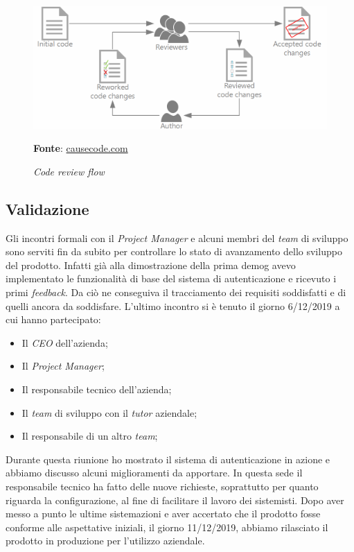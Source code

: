     \begin{figure}[ht]
        \centering
        \includegraphics[width=1\textwidth]{immagini/code_review.png}
        \caption{\textit{Code review flow}}
        \textbf{Fonte}:
        \href{https://storage.googleapis.com/causecode-wordpress-media/2019/01/97795825-code-review-process-1024x429.png}{causecode.com}
        \label{fig: Code review flow}
    \end{figure}

\subsection{Validazione}
Gli incontri formali con il \textit{Project Manager} e alcuni membri del \textit{team} di sviluppo sono serviti fin da subito per controllare lo stato di avanzamento dello sviluppo del prodotto. Infatti già alla dimostrazione della prima \gls{demog} avevo implementato le funzionalità di base del sistema di autenticazione e ricevuto i primi \textit{feedback}. Da ciò ne conseguiva il tracciamento dei requisiti soddisfatti e di quelli ancora da soddisfare.
L'ultimo incontro si è tenuto il giorno 6/12/2019 a cui hanno partecipato:
    \begin{itemize}
            \item Il \textit{CEO} dell'azienda;
            \item Il \textit{Project Manager};
            \item Il responsabile tecnico dell'azienda;
            \item Il \textit{team} di sviluppo con il \textit{tutor} aziendale;
            \item Il responsabile di un altro \textit{team};
    \end{itemize}
Durante questa riunione ho mostrato il sistema di autenticazione in azione e abbiamo discusso alcuni miglioramenti da apportare. In questa sede il responsabile tecnico ha fatto delle nuove richieste, soprattutto per quanto riguarda la configurazione, al fine di facilitare il lavoro dei sistemisti. Dopo aver messo a punto le ultime sistemazioni e aver accertato che il prodotto fosse conforme alle aspettative iniziali, il giorno 11/12/2019, abbiamo rilasciato il prodotto in produzione per l'utilizzo aziendale. \\